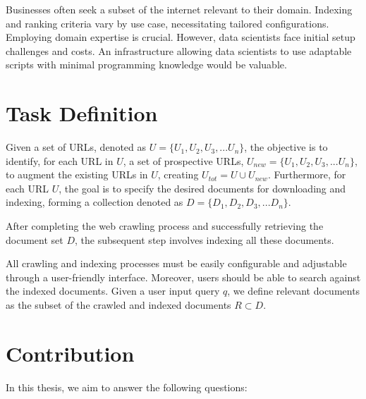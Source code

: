 Businesses often seek a subset of the internet relevant to their domain. Indexing and ranking criteria vary by use case, necessitating tailored configurations. Employing domain expertise is crucial. However, data scientists face initial setup challenges and costs. An infrastructure allowing data scientists to use adaptable scripts with minimal programming knowledge would be valuable. 

\section{Task Definition}
Given a set of URLs, denoted as $U = \{U_1, U_2, U_3, ...U_n\}$, the objective is to identify, for each URL in $U$, a set of prospective URLs, $U_{new} = \{U_1, U_2, U_3, ...U_n\}$, to augment the existing URLs in $U$, creating $U_{tot} = U \cup U_{new}$. Furthermore, for each URL $U$, the goal is to specify the desired documents for downloading and indexing, forming a collection denoted as $D = \{D_1, D_2, D_3, ...D_n\}$.

After completing the web crawling process and successfully retrieving the document set $D$, the subsequent step involves indexing all these documents. 

All crawling and indexing processes must be easily configurable and adjustable through a user-friendly interface. Moreover, users should be able to search against the indexed documents. Given a user input query $q$, we define relevant documents as the subset of the crawled and indexed documents $R \subset D$.

\section{Contribution}

In this thesis, we aim to answer the following questions:

